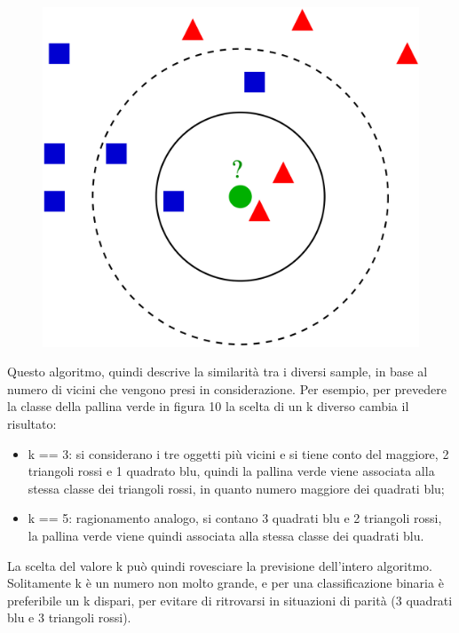 \documentclass[12pt,a4paper]{article}
\begin{document}
\begin{figure}[h]
    \centering
    \includegraphics[scale=0.07]{KnnClassification.png}
    \caption{}
\end{figure}

Questo algoritmo, quindi descrive la similarità tra i diversi sample, in base al numero di vicini che vengono presi in considerazione. Per esempio, per prevedere la classe della pallina verde in figura 10 la scelta di un k diverso cambia il risultato:
\begin{itemize}
    \item k == 3: si considerano i tre oggetti più vicini e si tiene conto del maggiore, 2 triangoli rossi e 1 quadrato blu, quindi la pallina verde viene associata alla stessa classe dei triangoli rossi, in quanto numero maggiore dei quadrati blu;
    \item k == 5: ragionamento analogo, si contano 3 quadrati blu e 2 triangoli rossi, la pallina verde viene quindi associata alla stessa classe dei quadrati blu.
\end{itemize}

La scelta del valore k può quindi rovesciare la previsione dell'intero algoritmo. Solitamente k è un numero non molto grande, e per una classificazione binaria è preferibile un k dispari, per evitare di ritrovarsi in situazioni di parità (3 quadrati blu e 3 triangoli rossi). \hfill \break
\end{document}
